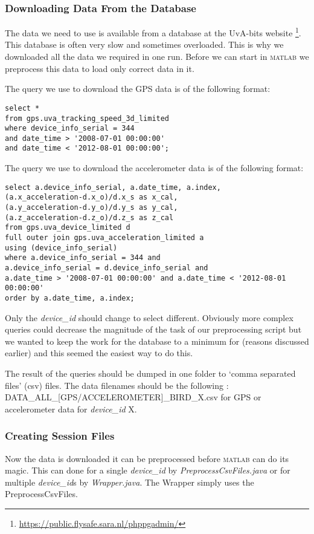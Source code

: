 \subsubsection{Downloading Data From the Database}
The data we need to use is available from a database at the UvA-bits website
\footnote{\url{https://public.flysafe.sara.nl/phppgadmin/} }. This database is often very slow 
and sometimes overloaded. This is why we downloaded all the data we required in one run. 
Before we can start in \textsc{matlab} we preprocess this data to load only correct data
in it.

The query we use to download the GPS data is of the following format: 
%
\begin{verbatim}
select *
from gps.uva_tracking_speed_3d_limited
where device_info_serial = 344 
and date_time > '2008-07-01 00:00:00' 
and date_time < '2012-08-01 00:00:00';
\end{verbatim}

The query we use to download the accelerometer data is of the following format:
\begin{verbatim}
select a.device_info_serial, a.date_time, a.index,
(a.x_acceleration-d.x_o)/d.x_s as x_cal,
(a.y_acceleration-d.y_o)/d.y_s as y_cal,
(a.z_acceleration-d.z_o)/d.z_s as z_cal
from gps.uva_device_limited d
full outer join gps.uva_acceleration_limited a
using (device_info_serial)
where a.device_info_serial = 344 and
a.device_info_serial = d.device_info_serial and
a.date_time > '2008-07-01 00:00:00' and a.date_time < '2012-08-01 00:00:00'
order by a.date_time, a.index;
\end{verbatim}

Only the \textit{device\_id} should change to select different. Obviously more complex queries could 
decrease the magnitude of the task of our preprocessing script but we wanted to keep the
work for the database to a minimum for (reasons discussed earlier) and this seemed the
easiest way to do this. 

The result of the queries should be dumped in one folder to `comma separated files' (csv) files.
The data filenames should be the following : DATA\_ALL\_[GPS/ACCELEROMETER]\_BIRD\_X.csv for 
GPS or accelerometer data for \textit{device\_id} X. 

\subsubsection{Creating Session Files}
Now the data is downloaded it can be preprocessed before \textsc{matlab} can do its magic. 
This can done for a single \textit{device\_id} by \textit{PreprocessCsvFiles.java} or 
for multiple \textit{device\_id}s by \textit{Wrapper.java}. The Wrapper simply uses the PreprocessCsvFiles. 

